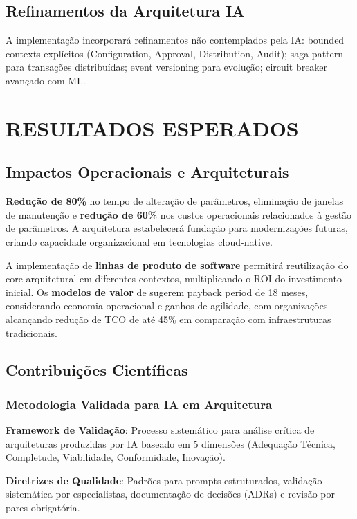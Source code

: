 \section{Refinamentos da Arquitetura IA}

A implementação incorporará refinamentos não contemplados pela IA: bounded contexts explícitos (Configuration, Approval, Distribution, Audit); saga pattern para transações distribuídas; event versioning para evolução; circuit breaker avançado com ML.

\chapter{RESULTADOS ESPERADOS}

\section{Impactos Operacionais e Arquiteturais}

\textbf{Redução de 80\%} no tempo de alteração de parâmetros, eliminação de janelas de manutenção e \textbf{redução de 60\%} nos custos operacionais relacionados à gestão de parâmetros. A arquitetura estabelecerá fundação para modernizações futuras, criando capacidade organizacional em tecnologias cloud-native.

A implementação de \textbf{linhas de produto de software}  permitirá reutilização do core arquitetural em diferentes contextos, multiplicando o ROI do investimento inicial. Os \textbf{modelos de valor} de  sugerem payback period de 18 meses, considerando economia operacional e ganhos de agilidade, com organizações alcançando redução de TCO de até 45\% em comparação com infraestruturas tradicionais.

\section{Contribuições Científicas}

\subsection{Metodologia Validada para IA em Arquitetura}

\textbf{Framework de Validação}: Processo sistemático para análise crítica de arquiteturas produzidas por IA baseado em 5 dimensões (Adequação Técnica, Completude, Viabilidade, Conformidade, Inovação).

\textbf{Diretrizes de Qualidade}: Padrões para prompts estruturados, validação sistemática por especialistas, documentação de decisões (ADRs) e revisão por pares obrigatória.

